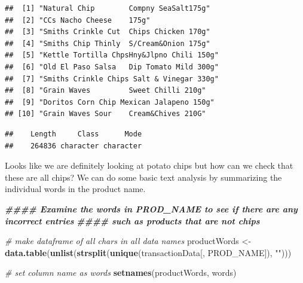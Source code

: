 \documentclass[
]{article}
\newenvironment{Shaded}{\begin{snugshade}}{\end{snugshade}}
\newcommand{\CommentTok}[1]{\textcolor[rgb]{0.56,0.35,0.01}{\textit{#1}}}
\newcommand{\DecValTok}[1]{\textcolor[rgb]{0.00,0.00,0.81}{#1}}
\newcommand{\DocumentationTok}[1]{\textcolor[rgb]{0.56,0.35,0.01}{\textbf{\textit{#1}}}}
\newcommand{\FunctionTok}[1]{\textcolor[rgb]{0.13,0.29,0.53}{\textbf{#1}}}
\newcommand{\NormalTok}[1]{#1}
\newcommand{\OtherTok}[1]{\textcolor[rgb]{0.56,0.35,0.01}{#1}}
\newcommand{\SpecialCharTok}[1]{\textcolor[rgb]{0.81,0.36,0.00}{\textbf{#1}}}
\newcommand{\StringTok}[1]{\textcolor[rgb]{0.31,0.60,0.02}{#1}}
\begin{document}
\begin{Shaded}
\end{Shaded}

\begin{verbatim}
##  [1] "Natural Chip        Compny SeaSalt175g"  
##  [2] "CCs Nacho Cheese    175g"                
##  [3] "Smiths Crinkle Cut  Chips Chicken 170g"  
##  [4] "Smiths Chip Thinly  S/Cream&Onion 175g"  
##  [5] "Kettle Tortilla ChpsHny&Jlpno Chili 150g"
##  [6] "Old El Paso Salsa   Dip Tomato Mild 300g"
##  [7] "Smiths Crinkle Chips Salt & Vinegar 330g"
##  [8] "Grain Waves         Sweet Chilli 210g"   
##  [9] "Doritos Corn Chip Mexican Jalapeno 150g" 
## [10] "Grain Waves Sour    Cream&Chives 210G"
\end{verbatim}

\begin{Shaded}
\end{Shaded}

\begin{verbatim}
##    Length     Class      Mode 
##    264836 character character
\end{verbatim}

Looks like we are definitely looking at potato chips but how can we
check that these are all chips? We can do some basic text analysis by
summarizing the individual words in the product name.

\begin{Shaded}
\begin{Highlighting}[]
\DocumentationTok{\#\#\#\# Examine the words in PROD\_NAME to see if there are any incorrect entries}
\DocumentationTok{\#\#\#\# such as products that are not chips}

\CommentTok{\# make dataframe of all chars in all data names}
\NormalTok{productWords }\OtherTok{\textless{}{-}} \FunctionTok{data.table}\NormalTok{(}\FunctionTok{unlist}\NormalTok{(}\FunctionTok{strsplit}\NormalTok{(}\FunctionTok{unique}\NormalTok{(transactionData[, PROD\_NAME]), }\StringTok{""}\NormalTok{)))}

\CommentTok{\# set column name as words}
\FunctionTok{setnames}\NormalTok{(productWords, }\StringTok{\textquotesingle{}words\textquotesingle{}}\NormalTok{)}
\end{Highlighting}
\end{Shaded}
\end{document}
